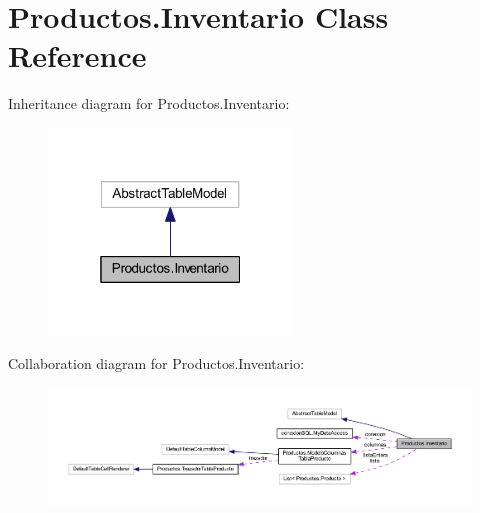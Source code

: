 \hypertarget{class_productos_1_1_inventario}{}\section{Productos.\+Inventario Class Reference}
\label{class_productos_1_1_inventario}


Inheritance diagram for Productos.\+Inventario\+:
\nopagebreak
\begin{figure}[H]
\begin{center}
\leavevmode
\includegraphics[width=184pt]{class_productos_1_1_inventario__inherit__graph}
\end{center}
\end{figure}


Collaboration diagram for Productos.\+Inventario\+:
\nopagebreak
\begin{figure}[H]
\begin{center}
\leavevmode
\includegraphics[width=350pt]{class_productos_1_1_inventario__coll__graph}
\end{center}
\end{figure}
